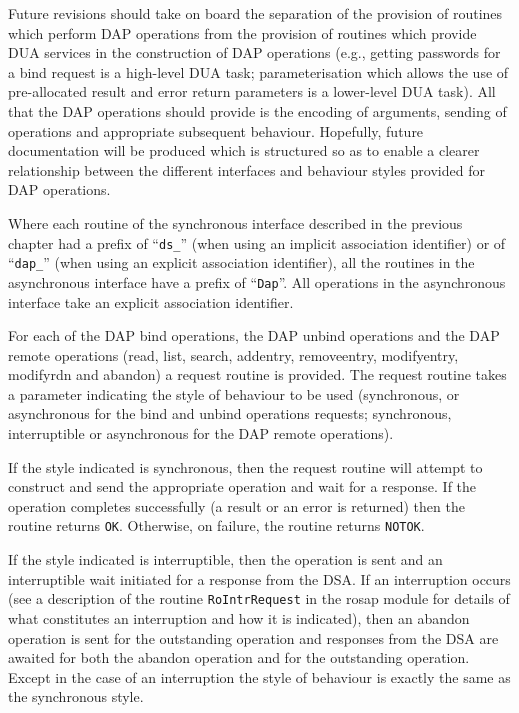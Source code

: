Future revisions should take on board the separation of the provision
of routines which perform DAP operations from the provision of routines
which provide DUA services in the construction of DAP operations (e.g.,
getting passwords for a bind request is a high-level DUA task;
parameterisation which allows the use of pre-allocated result and 
error return parameters is a lower-level DUA task). All that the DAP
operations should provide is the encoding of arguments, sending of
operations and appropriate subsequent behaviour.
Hopefully, future documentation will be produced which is structured
so as to enable a clearer relationship between the different interfaces
and behaviour styles provided for DAP operations.

Where each routine of the synchronous interface described in the
previous chapter had a prefix of ``\verb"ds_"'' (when using an implicit
association identifier) or of ``\verb"dap_"'' (when using an explicit
association identifier), all the routines in the asynchronous interface
have a prefix of ``\verb"Dap"''.
All operations in the asynchronous interface take an explicit
association identifier.

For each of the DAP bind operations, the DAP unbind operations and the
DAP remote operations (read, list, search, addentry, removeentry,
modifyentry, modifyrdn and abandon) a request routine is provided.
The request routine takes a parameter indicating the style of behaviour
to be used (synchronous, or asynchronous for the bind and unbind
operations requests; synchronous, interruptible or asynchronous for
the DAP remote operations).

If the style indicated is synchronous, then the request routine will
attempt to construct and send the appropriate operation and wait for
a response.
If the operation completes successfully (a result or an error is
returned) then the routine returns \verb"OK". Otherwise, on failure,
the routine returns \verb"NOTOK".

If the style indicated is interruptible, then the operation is sent and
an interruptible wait initiated for a response from the DSA.
If an interruption occurs (see a description of the routine
\verb"RoIntrRequest" in the rosap module for details
of what constitutes an interruption and how it is indicated), then an
abandon operation is sent for the outstanding operation and responses
from the DSA are awaited for both the abandon operation and for the
outstanding operation.
Except in the case of an interruption the style of behaviour is exactly
the same as the synchronous style.

